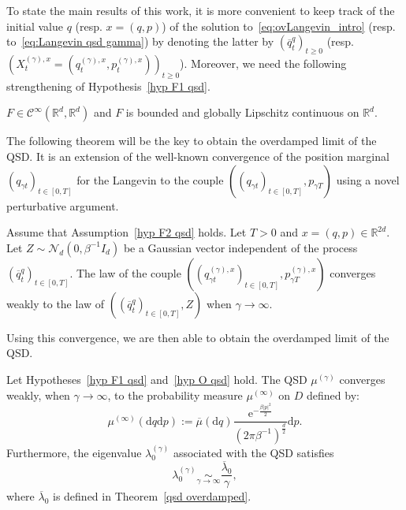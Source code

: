 \documentclass[preprint,EJP]{ejpecp}
\begin{document}
To state the main results of this work, it is more convenient to keep track of the initial value $q$ (resp. $x=(q,p)$) of the solution to~\eqref{eq:ovLangevin_intro} (resp. to~\eqref{eq:Langevin qsd gamma}) by denoting the latter by $(\overline{q}^q_t)_{t \geq 0}$ (resp. $(X^{(\gamma),x}_t = (q^{(\gamma),x}_t,p^{(\gamma),x}_t))_{t \geq 0}$). Moreover, we need the following strengthening of Hypothesis~\ref{hyp F1 qsd}.
\begin{hypothesis}\label{hyp F2 qsd}
$F\in\mathcal{C}^\infty(\mathbb{R}^{d},\mathbb{R}^{d})$ and $F$ is bounded and globally Lipschitz continuous on $\mathbb{R}^d$. 
\end{hypothesis} 

The following theorem will be the key to obtain the overdamped limit of the QSD. It is an extension of the well-known convergence of the position marginal $(q_{\gamma t})_{t\in[0,T]}$ for the Langevin to the couple $((q_{\gamma t})_{t\in[0,T]},p_{\gamma T})$ using a novel perturbative argument.
\begin{theorem}\label{cv loi indep} Assume that Assumption~\ref{hyp F2 qsd} holds.
Let $T>0$ and $x=(q,p)\in\mathbb{R}^{2d}$. Let $Z  \sim  \mathcal{N}_{d}(0,\beta^{-1} I_d)$ be a Gaussian vector independent of the process $(\overline{q}^q_t)_{t\in[0,T]}$. The law of the couple $((q^{(\gamma),x}_{\gamma t})_{t\in[0,T]},p^{(\gamma),x}_{\gamma T})$ converges weakly to the law of  $((\overline{q}^q_t)_{t\in[0,T]},Z)$ when $\gamma\rightarrow\infty$.
\end{theorem}

Using this convergence, we are then able to obtain the overdamped limit of the QSD.
\begin{theorem}\label{cv etroite} Let Hypotheses~\ref{hyp F1 qsd} and~\ref{hyp O qsd} hold. The QSD $\mu^{(\gamma)}$ converges weakly, when $\gamma\rightarrow\infty$, to the probability measure $\mu^{(\infty)}$ on $D$ defined by:
 \begin{equation}\label{mesure limite qsd}
     \mu^{(\infty)}(\mathrm{d}q \mathrm{d}p):=\overline{\mu}(\mathrm{d}q) \frac{\mathrm{e}^{-\frac{\beta\vert p\vert^2}{2}}}{(2\pi\beta^{-1})^{\frac{d}{2}}} \mathrm{d}p. 
 \end{equation}
 Furthermore, the eigenvalue $\lambda_0^{(\gamma)}$ associated with the QSD satisfies
 $$\lambda_0^{(\gamma)}\underset{\gamma\rightarrow\infty}{\sim}\frac{\overline{\lambda}_0}{\gamma},$$
 where $\overline{\lambda}_0$ is defined in Theorem~\ref{qsd overdamped}.
\end{theorem}
\end{document}
